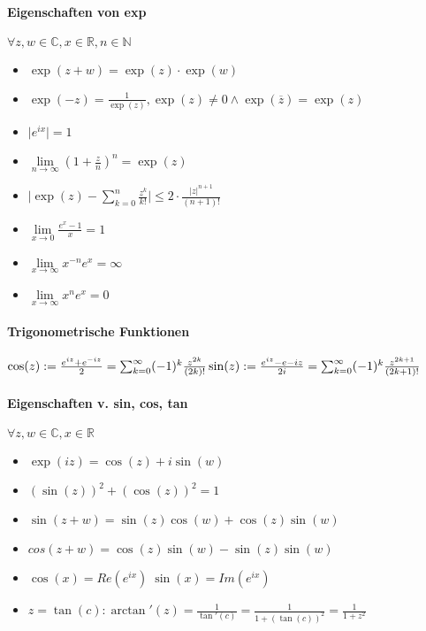 \documentclass[paper=a4,paper=landscape, fontsize=6pt,DIV=25, twoside]{scrartcl}
\newcommand{\real}{{\mathbb{R}}}
\newcommand{\compl}{\mathbb{C}}
\newcommand{\nat}{\mathbb{N}}
\begin{document}
\begin{multicols*}{4}
		\paragraph{Eigenschaften von exp}
		$\forall z,w \in \compl, x \in \real, n \in \nat$
		\begin{itemize}[noitemsep,nolistsep]
			\item $\exp(z+w)=\exp(z)\cdot \exp(w)$
			\item $\exp(-z)=\frac{1}{\exp(z)}, \exp(z) \neq 0 \wedge \exp(\overline{z})=\exp(z)$
			\item $\lvert e^{ix} \rvert = 1$
			\item $\lim\limits_{n \rightarrow \infty} (1+\frac{z}{n})^n=\exp(z)$
			\item $ \lvert \exp(z)- \sum_{k=0}^{n} \frac{z^k}{k!} \rvert \leq 2 \cdot \frac{\lvert z \rvert ^{n+1}}{(n+1)!}$
			\item $ \lim\limits_{x \rightarrow 0} \frac{e^x-1}{x} = 1$
			\item $ \lim\limits_{x \rightarrow \infty} x^{-n}e^x=\infty$
			\item $ \lim\limits_{x \rightarrow \infty} x^ne^x=0$
		\end{itemize}
			\paragraph{Trigonometrische Funktionen}
			$  \cos(z):=\frac{e^{iz}+e^{-iz}}{2} = \sum_{k=0}^{\infty} (-1)^k\frac{z^{2k}}{(2k)!}\\\sin(z):=\frac{e^{iz}-e{-iz}}{2i} = \sum_{k=0}^{\infty} (-1)^k \frac{z^{2k+1}}{(2k+1)!}$
			\paragraph{Eigenschaften v. sin, cos, tan}
			$\forall z,w \in \compl, x \in \real$
			
			\begin{itemize}[noitemsep,nolistsep]
				\item $\exp(iz) = \cos(z)+i\sin(w)$
				\item $(\sin(z))^2+(\cos(z))^2=1$
				\item $\sin(z+w)=\sin(z)\cos(w)+\cos(z)\sin(w)$
				\item $cos(z+w)=\cos(z)\sin(w)-\sin(z)\sin(w)$
				\item $\cos(x)=Re(e^{ix}) \; \sin(x)=Im(e^{ix})$
				\item $z=\tan(c): \arctan'(z)=\frac{1}{\tan'(c)}=\frac{1}{1+(\tan(c))^2}=\frac{1}{1+z^2}$
			\end{itemize}
		

\end{multicols*}
\end{document}

